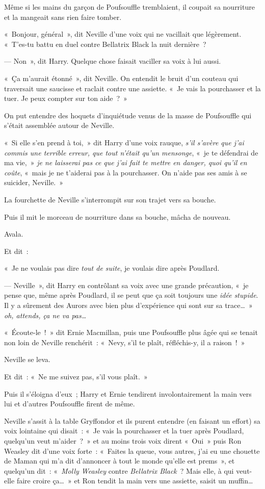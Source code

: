 Même si les mains du garçon de Poufsouffle tremblaient, il coupait sa nourriture et la mangeait sans rien faire tomber.

«~Bonjour, général~», dit Neville d'une voix qui ne vacillait que légèrement.
«~T'es-tu battu en duel contre Bellatrix Black la nuit dernière~?

--- Non~», dit Harry.
Quelque chose faisait vaciller sa voix à lui aussi.

«~Ça m'aurait étonné~», dit Neville.
On entendit le bruit d'un couteau qui traversait une saucisse et raclait contre une assiette.
«~Je vais la pourchasser et la tuer.
Je peux compter sur ton aide~?~»

On put entendre des hoquets d'inquiétude venus de la masse de Poufsouffle qui s'était assemblée autour de Neville.

«~Si elle s'en prend à toi,~» dit Harry d'une voix rauque, \emph{s'il s'avère que j'ai commis une terrible erreur, que tout n'était qu'un mensonge}, «~je te défendrai de ma vie,~» \emph{je ne laisserai pas ce que j'ai fait te mettre en danger, quoi qu'il en coûte}, «~mais je ne t'aiderai pas à la pourchasser.
On n'aide pas ses amis à se suicider, Neville.~»

La fourchette de Neville s'interrompit sur son trajet vers sa bouche.

Puis il mit le morceau de nourriture dans sa bouche, mâcha de nouveau.

Avala.

Et dit~:

«~Je ne voulais pas dire \emph{tout de suite}, je voulais dire après Poudlard.

--- Neville~», dit Harry en contrôlant sa voix avec une grande précaution, «~je pense que, même après Poudlard, il se peut que ça soit toujours une \emph{idée stupide}.
Il y a sûrement des Aurors avec bien plus d'expérience qui sont sur sa trace…~»
\emph{oh, attends, ça ne va pas…}

«~Écoute-le~!~»
dit Ernie Macmillan, puis une Poufsouffle plus âgée qui se tenait non loin de Neville renchérit~: «~Nevy, s'il te plaît, réfléchis-y, il a raison~!~»

Neville se leva.

Et dit~: «~Ne me suivez pas, s'il vous plaît.~»

Puis il s'éloigna d'eux~; Harry et Ernie tendirent involontairement la main vers lui et d'autres Poufsouffle firent de même.

Neville s'assit à la table Gryffondor et ils purent entendre (en faisant un effort) sa voix lointaine qui disait~: «~Je vais la pourchasser et la tuer après Poudlard, quelqu'un veut m'aider~?~»
et au moins trois voix dirent «~Oui~» puis Ron Weasley dit d'une voix forte~: «~Faites la queue, vous autres, j'ai eu une chouette de Maman qui m'a dit d'annoncer à tout le monde qu'elle est prems~», et quelqu'un dit~: «~\emph{Molly Weasley} contre \emph{Bellatrix Black}~?
Mais elle, à qui veut-elle faire croire ça…~»
et Ron tendit la main vers une assiette, saisit un muffin…

